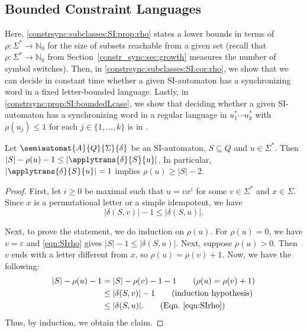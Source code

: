 \subsection{Bounded Constraint Languages}
\label{constrsync:input:SI:sec:bounded} 

Here, \cref{constrsync:subclasses:SI:prop:rho} 
states a lower bounds in terms of $\rho \colon \Sigma^* \to \mathbb N_0$
for the size of subsets 
reachable from a given set (recall that $\rho \colon \Sigma^* \to \mathbb N_0$ from Section~\ref{constr_sync:sec:growth} 
measures the number of symbol switches).
Then, in \cref{constrsync:subclasses:SI:cor:rho}, 
we show that we can decide in constant time whether
a given SI-automaton has a synchronizing
word in a fixed letter-bounded language.
Lastly, in \cref{constrsync:prop:SI:boundedLcase},
we show that deciding whether
a given SI-automaton has a synchronizing
word in a regular language in $u_1^* \cdots u_k^*$
with $\rho(u_j) \le 1$ for each $j \in \{1,\ldots,k\}$
is in \LOGSPACE.

\begin{proposition}\label{constrsync:subclasses:SI:prop:rho}
	Let $\semiautomat{A}{Q}{\Sigma}{\delta}$ be an SI-automaton, $S \subseteq Q$
	and $u \in \Sigma^*$. Then $|S| - \rho(u) - 1 \le |\applytrans{\delta}{S}{u}|$.	
	In particular, $|\applytrans{\delta}{S}{u}| = 1$
	implies $\rho(u) \ge |S| - 2$. 
\end{proposition}
\begin{proof}
	First, let $i \ge 0$ be maximal
	such that $u = vx^i$ for some $v \in \Sigma^*$ and $x \in \Sigma$.
	Since $x$ is a permutational letter or a simple idempotent,
	we have
	\begin{equation} \label{eqn:SIrho}
	|\delta(S, v)| - 1 \le |\delta(S, u)|.
    \end{equation}
    
    Next, to prove the statement, we do induction on $\rho(u)$.
    For $\rho(u) = 0$, we have $v = \varepsilon$
    and \cref{eqn:SIrho} gives $|S| - 1 \le |\delta(S, u)|$. %
	Next, suppose $\rho(u) > 0$.
	Then $v$ ends with a letter different from $x$,
	so $\rho(u) = \rho(v) + 1$.
    Now, we have the following:
	\begin{align*}
		|S| - \rho(u) - 1 & = |S| - \rho(v) - 1 - 1 \tag{$\rho(u) = \rho(v) + 1$} \\
		                  & \le |\delta(S, v)| - 1 \tag{induction hypothesis}\\
		                  & \le |\delta(S, u)|.   \tag{Eqn.~\eqref{eqn:SIrho}}
	\end{align*}
	Thus, by induction, we obtain the claim.
\end{proof}

